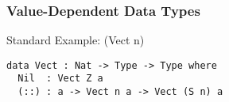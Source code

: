 \begin{frame}[fragile]
\frametitle{Value-Dependent Data Types}

\begin{block}{Standard Example: (Vect n)}
\begin{lstlisting}
data Vect : Nat -> Type -> Type where
  Nil  : Vect Z a
  (::) : a -> Vect n a -> Vect (S n) a
\end{lstlisting}
\end{block}

\end{frame}
